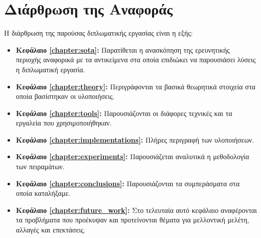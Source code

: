 \section{Διάρθρωση της Αναφοράς}
\label{section:layout}

Η διάρθρωση της παρούσας διπλωματικής εργασίας είναι η εξής:

\begin{itemize}
  \item{\textbf{Κεφάλαιο \ref{chapter:sota}:} Παρατίθεται η ανασκόπηση της ερευνητικής
      περιοχής αναφορικά με τα αντικείμενα στα οποία επιδιώκει να
      παρουσιάσει λύσεις η διπλωματική εργασία.
    }
  \item{\textbf{Κεφάλαιο \ref{chapter:theory}:} Περιγράφονται τα βασικά θεωρητικά στοιχεία
      στα οποία βασίστηκαν οι υλοποιήσεις.
    }
  \item{\textbf{Κεφάλαιο \ref{chapter:tools}:} Παρουσιάζονται οι
      διάφορες τεχνικές και τα εργαλεία που χρησιμοποιήθηκαν.
    }
  \item{\textbf{Κεφάλαιο \ref{chapter:implementations}:} Πλήρες περιγραφή των υλοποιήσεων.
    }
  \item{\textbf{Κεφάλαιο \ref{chapter:experiments}:} Παρουσιάζεται αναλυτικά η μεθοδολογία των
      πειραμάτων.
    }
  \item{\textbf{Κεφάλαιο \ref{chapter:conclusions}:} Παρουσιάζονται τα συμπεράσματα στα οποία
      καταλήξαμε.
    }
  \item{\textbf{Κεφάλαιο \ref{chapter:future_work}:} Στο τελευταία αυτό κεφάλαιο αναφέρονται τα
      προβλήματα που προέκυψαν και προτείνονται θέματα για μελλοντική
      μελέτη, αλλαγές και επεκτάσεις.
    }
\end{itemize}



